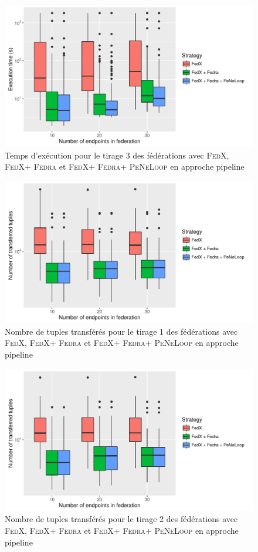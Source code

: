 \documentclass[a4paper]{article}
\def\fedra{\textsc{Fedra}\xspace}
\def\fedx{\textsc{FedX}\xspace}
\def\peneloop{\textsc{PeNeLoop}\xspace}
\begin{document}
\begin{figure}[h]
    \centering
    \includegraphics{boxplots/fed3_execution_time.pdf}
    \caption{Temps d'exécution pour le tirage 3 des fédérations avec \fedx, \fedx + \fedra et \fedx + \fedra + \peneloop en approche pipeline}
    \label{fig:fed3_time}
\end{figure}

\begin{figure}[h]
    \centering
    \includegraphics{boxplots/fed1_transferred_tuples.pdf}
    \caption{Nombre de tuples transférés pour le tirage 1 des fédérations avec \fedx, \fedx + \fedra et \fedx + \fedra + \peneloop en approche pipeline}
    \label{fig:fed1_tuples}
\end{figure}

\begin{figure}[h]
    \centering
    \includegraphics{boxplots/fed2_transferred_tuples.pdf}
    \caption{Nombre de tuples transférés pour le tirage 2 des fédérations avec \fedx, \fedx + \fedra et \fedx + \fedra + \peneloop en approche pipeline}
    \label{fig:fed2_tuples}
\end{figure}
\end{document}
